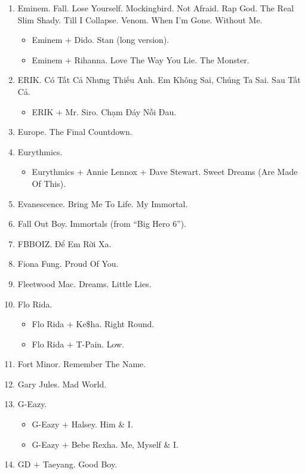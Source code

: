 \documentclass{article}
\begin{document}
\begin{enumerate}
\begin{itemize}
	\end{itemize}
	\item {\sc Eminem.} Fall. Lose Yourself. Mockingbird. Not Afraid. Rap God. The Real Slim Shady. Till I Collapse. Venom. When I'm Gone. Without Me.
	\begin{itemize}
		\item {\sc Eminem $+$ Dido.} Stan (long version).
		\item {\sc Eminem $+$ Rihanna.} Love The Way You Lie. The Monster.
	\end{itemize}
	\item {\sc ERIK.} Có Tất Cả Nhưng Thiếu Anh. Em Không Sai, Chúng Ta Sai. Sau Tất Cả.
	\begin{itemize}
		\item {\sc ERIK $+$ Mr. Siro.} Chạm Đáy Nỗi Đau.
	\end{itemize}
	\item {\sc Europe.} The Final Countdown.
	\item {\sc Eurythmics.}
	\begin{itemize}
		\item {\sc Eurythmics $+$ Annie Lennox $+$ Dave Stewart.} Sweet Dreams (Are Made Of This).
	\end{itemize}
	\item {\sc Evanescence.} Bring Me To Life. My Immortal.
	\item {\sc Fall Out Boy.} Immortals (from ``Big Hero 6'').
	\item {\sc FBBOIZ.} Để Em Rời Xa.
	\item {\sc Fiona Fung.} Proud Of You.
	\item {\sc Fleetwood Mac.} Dreams. Little Lies.
	\item {\sc Flo Rida.}
	\begin{itemize}
		\item {\sc Flo Rida $+$ Ke\$ha.} Right Round.
		\item {\sc Flo Rida $+$ T-Pain.} Low.
	\end{itemize}
	\item {\sc Fort Minor.} Remember The Name.
	\item {\sc Gary Jules.} Mad World.
	\item {\sc G-Eazy.}
	\begin{itemize}
		\item {\sc G-Eazy $+$ Halsey.} Him \& I.
		\item {\sc G-Eazy $+$ Bebe Rexha.} Me, Myself \& I.
	\end{itemize}
	\item {\sc GD $+$ Taeyang.} Good Boy.

\end{enumerate}
\end{document}
